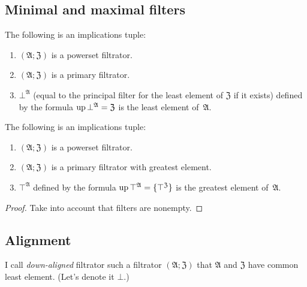 \subsection{Minimal and maximal filters}
\begin{obvious}
The following is an implications tuple:
\begin{enumerate}
\item $(\mathfrak{A};\mathfrak{Z})$ is a powerset filtrator.
\item $(\mathfrak{A};\mathfrak{Z})$ is a primary filtrator.
\item $\bot^{\mathfrak{A}}$ (equal to the principal filter for the least
element of $\mathfrak{Z}$ if it exists) defined by the formula $\operatorname{up}\bot^{\mathfrak{A}}=\mathfrak{Z}$
is the least element of~$\mathfrak{A}$.
\end{enumerate}
\end{obvious}
\begin{prop}
The following is an implications tuple:
\begin{enumerate}
\item $(\mathfrak{A};\mathfrak{Z})$ is a powerset filtrator.
\item $(\mathfrak{A};\mathfrak{Z})$ is a primary filtrator with greatest
element.
\item $\top^{\mathfrak{A}}$ defined by the formula $\operatorname{up}\top^{\mathfrak{A}}=\{\top^{\mathfrak{Z}}\}$
is the greatest element of~$\mathfrak{A}$.
\end{enumerate}
\end{prop}
\begin{proof}
Take into account that filters are nonempty.
\end{proof}

\subsection{Alignment}
\begin{defn}
I call \emph{down-aligned} filtrator
such a filtrator $(\mathfrak{A};\mathfrak{Z})$ that $\mathfrak{A}$
and $\mathfrak{Z}$ have common least element. (Let's denote it $\bot$.)
\end{defn}

